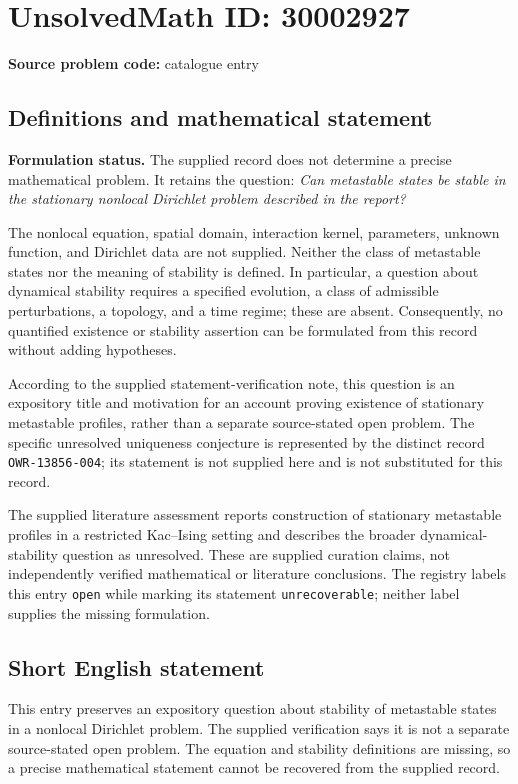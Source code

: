 \documentclass[11pt]{article}
\begin{document}
\section*{UnsolvedMath ID: 30002927}
\textbf{Source problem code:} catalogue entry
\subsection{Definitions and mathematical statement}
\textbf{Formulation status.} The supplied record does not determine a precise mathematical problem. It retains the question: \emph{Can metastable states be stable in the stationary nonlocal Dirichlet problem described in the report?}

The nonlocal equation, spatial domain, interaction kernel, parameters, unknown function, and Dirichlet data are not supplied. Neither the class of metastable states nor the meaning of stability is defined. In particular, a question about dynamical stability requires a specified evolution, a class of admissible perturbations, a topology, and a time regime; these are absent. Consequently, no quantified existence or stability assertion can be formulated from this record without adding hypotheses.

According to the supplied statement-verification note, this question is an expository title and motivation for an account proving existence of stationary metastable profiles, rather than a separate source-stated open problem. The specific unresolved uniqueness conjecture is represented by the distinct record \texttt{OWR-13856-004}; its statement is not supplied here and is not substituted for this record.

The supplied literature assessment reports construction of stationary metastable profiles in a restricted Kac--Ising setting and describes the broader dynamical-stability question as unresolved. These are supplied curation claims, not independently verified mathematical or literature conclusions. The registry labels this entry \texttt{open} while marking its statement \texttt{unrecoverable}; neither label supplies the missing formulation.
\subsection{Short English statement}
This entry preserves an expository question about stability of metastable states in a nonlocal Dirichlet problem. The supplied verification says it is not a separate source-stated open problem. The equation and stability definitions are missing, so a precise mathematical statement cannot be recovered from the supplied record.
\end{document}
